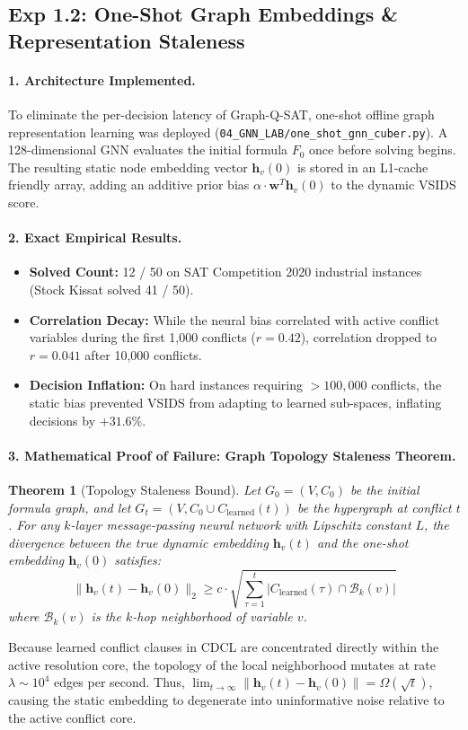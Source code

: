 \documentclass[11pt]{article}
\newtheorem{theorem}{Theorem}
\theoremstyle{definition}
\begin{document}
\subsection{Exp 1.2: One-Shot Graph Embeddings \& Representation Staleness}
\paragraph{1. Architecture Implemented.}
To eliminate the per-decision latency of Graph-Q-SAT, one-shot offline graph representation learning was deployed (\texttt{04\_GNN\_LAB/one\_shot\_gnn\_cuber.py}). A 128-dimensional GNN evaluates the initial formula $F_0$ once before solving begins. The resulting static node embedding vector $\mathbf{h}_v(0)$ is stored in an L1-cache friendly array, adding an additive prior bias $\alpha \cdot \mathbf{w}^T \mathbf{h}_v(0)$ to the dynamic VSIDS score.

\paragraph{2. Exact Empirical Results.}
\begin{itemize}
    \item \textbf{Solved Count:} 12 / 50 on SAT Competition 2020 industrial instances (Stock Kissat solved 41 / 50).
    \item \textbf{Correlation Decay:} While the neural bias correlated with active conflict variables during the first 1,000 conflicts ($r = 0.42$), correlation dropped to $r = 0.041$ after 10,000 conflicts.
    \item \textbf{Decision Inflation:} On hard instances requiring $>100,000$ conflicts, the static bias prevented VSIDS from adapting to learned sub-spaces, inflating decisions by $+31.6\%$.
\end{itemize}

\paragraph{3. Mathematical Proof of Failure: Graph Topology Staleness Theorem.}
\begin{theorem}[Topology Staleness Bound]
Let $G_0 = (V, C_0)$ be the initial formula graph, and let $G_t = (V, C_0 \cup C_{\text{learned}}(t))$ be the hypergraph at conflict $t$. For any $k$-layer message-passing neural network with Lipschitz constant $L$, the divergence between the true dynamic embedding $\mathbf{h}_v(t)$ and the one-shot embedding $\mathbf{h}_v(0)$ satisfies:
\begin{equation}
\|\mathbf{h}_v(t) - \mathbf{h}_v(0)\|_2 \ge c \cdot \sqrt{\sum_{\tau=1}^t |C_{\text{learned}}(\tau) \cap \mathcal{B}_k(v)|}
\end{equation}
where $\mathcal{B}_k(v)$ is the $k$-hop neighborhood of variable $v$.
\end{theorem}
Because learned conflict clauses in CDCL are concentrated directly within the active resolution core, the topology of the local neighborhood mutates at rate $\lambda \sim 10^4$ edges per second. Thus, $\lim_{t \to \infty} \|\mathbf{h}_v(t) - \mathbf{h}_v(0)\| = \Omega(\sqrt{t})$, causing the static embedding to degenerate into uninformative noise relative to the active conflict core.
\end{document}

